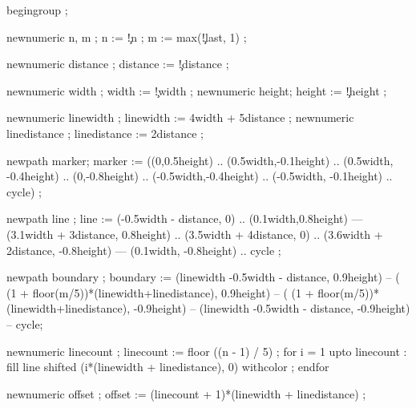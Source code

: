 

   

  begingroup ;

  newnumeric n, m ;
  n := \visualcounterparameter\c!n ;
  m := max(\visualcounterparameter\c!last, 1) ;

  newnumeric distance ; distance := \visualcounterparameter\c!distance ;

  newnumeric width ; width  := \visualcounterparameter\c!width ;
  newnumeric height; height := \visualcounterparameter\c!height ;

  newnumeric linewidth ; linewidth := 4width + 5distance ;
  newnumeric linedistance ; linedistance := 2distance ;

  newpath    marker; 
  marker := ((0,0.5height) .. (0.5width,-0.1height) .. (0.5width, -0.4height) 
         .. (0,-0.8height) 
         .. (-0.5width,-0.4height) .. (-0.5width, -0.1height) .. cycle) ;

  newpath    line ;
  line   := (-0.5width - distance, 0) .. (0.1width,0.8height) 
        --- (3.1width + 3distance,  0.8height) .. (3.5width + 4distance, 0) .. (3.6width + 2distance, -0.8height)
        --- (0.1width, -0.8height) .. cycle ;

  newpath boundary ;
  boundary := (linewidth -0.5width - distance, 0.9height) 
           -- ( (1 + floor(m/5))*(linewidth+linedistance), 0.9height) 
           -- ( (1 + floor(m/5))*(linewidth+linedistance), -0.9height)
           -- (linewidth -0.5width - distance, -0.9height) 
           -- cycle;


  newnumeric linecount ; linecount := floor ((n - 1) / 5) ;
  for i = 1 upto linecount :
    fill line shifted (i*(linewidth + linedistance), 0)
         withcolor   ;
  endfor

  newnumeric offset ; offset := (linecount + 1)*(linewidth + linedistance) ;


